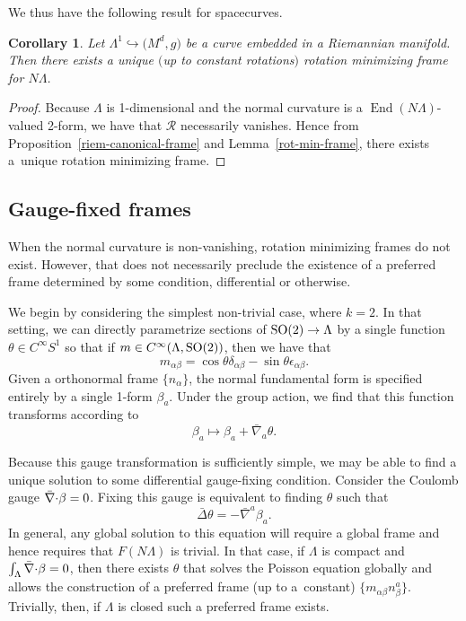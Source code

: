 \documentclass[pdftex]{sigma}
\numberwithin{equation}{section}
\newtheorem{Corollary}[Theorem]{Corollary}
\renewcommand{\=}{\stackrel \Lambda =}
\newcommand{\csdot}{\hspace{-0.75mm} \cdot \hspace{-0.75mm}}
\begin{document}
We thus have the following result for spacecurves.
\begin{Corollary}
Let $\Lambda^1 \hookrightarrow \bigl(M^d,g\bigr)$ be a curve embedded in a Riemannian manifold. Then there exists a unique $($up to constant rotations$)$ rotation minimizing frame for $N \Lambda$.
\end{Corollary}
\begin{proof}
Because $\Lambda$ is 1-dimensional and the normal curvature is a $\operatorname{End}(N \Lambda)$-valued 2-form, we have that $\mathcal{R}$ necessarily vanishes. Hence from Proposition~\ref{riem-canonical-frame} and Lemma~\ref{rot-min-frame}, there exists a~unique rotation minimizing frame.
\end{proof}

\subsection{Gauge-fixed frames} \label{gauge-fixed}
When the normal curvature is non-vanishing, rotation minimizing frames do not exist. However, that does not necessarily preclude the existence of a preferred frame determined by some condition, differential or otherwise.

We begin by considering the simplest non-trivial case, where $k=2$. In that setting, we can directly parametrize sections of ${\rm SO}(2) \rightarrow \Lambda$ by a single function $\theta \in C^\infty S^1$ so that if $m \in C^\infty(\Lambda, {\rm SO}(2))$, then we have that
\[
m_{\alpha \beta} = \cos \theta \delta_{\alpha \beta} - \sin \theta \epsilon_{\alpha \beta} .
\]
Given a orthonormal frame $\{n_{\alpha} \}$, the normal fundamental form is specified entirely by a single 1-form $\beta_a$. Under the group action, we find that this function transforms according to
\[
\beta_a \mapsto \beta_a + \bar{\nabla}_a \theta .
\]

Because this gauge transformation is sufficiently simple, we may be able to find a unique solution to some differential gauge-fixing condition. Consider the Coulomb gauge $\bar{\nabla} \csdot \beta = 0$. Fixing this gauge is equivalent to finding $\theta$ such that
\[
\bar{\Delta} \theta = - \bar{\nabla}^a \beta_a .
\]
In general, any global solution to this equation will require a global frame and hence requires that $F(N \Lambda)$ is trivial. In that case, if $\Lambda$ is compact and $\int_{\Lambda} \bar{\nabla} \csdot \beta = 0$, then there exists $\theta$ that solves the Poisson equation globally and allows the construction of a preferred frame (up to a~constant) $\big\{m_{\alpha \beta} n^a_{\beta}\big\}$. Trivially, then, if $\Lambda$ is closed such a preferred frame exists.
\end{document}
